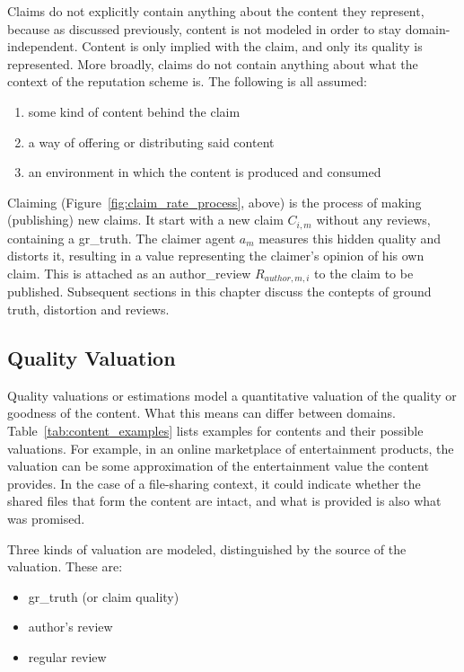 \documentclass[%
    ]{\PathToTumTemplate/thesis/tum_thesis}
\begin{document}
Claims do not explicitly contain anything about the content they represent, because as discussed previously, content is not modeled in order to stay domain-independent.
Content is only implied with the claim, and only its quality is represented.
More broadly, claims do not contain anything about what the context of the reputation scheme is.
The following is all assumed:
\begin{enumerate}
	\item some kind of content behind the claim
	\item a way of offering or distributing said content
	\item an environment in which the content is produced and consumed
\end{enumerate}

Claiming (Figure~\ref{fig:claim_rate_process}, above) is the process of making (publishing) new claims.
It start with a new claim $C_{i,m}$ without any reviews, containing a \gls{gr_truth}.
The claimer agent $a_m$ measures this hidden quality and distorts it, resulting in a value representing the claimer's opinion of his own claim.
This is attached as an \gls{author_review} $R_{author,m,i}$ to the claim to be published.
Subsequent sections in this chapter discuss the contepts of ground truth, distortion and reviews.


\subsection{Quality Valuation}
Quality valuations or estimations model a quantitative valuation of the quality or goodness of the content.
What this means can differ between domains.
Table~\ref{tab:content_examples} lists examples for contents and their possible valuations.
For example, in an online marketplace of entertainment products, the valuation can be some approximation of the entertainment value the content provides.
In the case of a file-sharing context, it could indicate whether the shared files that form the content are intact, and what is provided is also what was promised.

Three kinds of valuation are modeled, distinguished by the source of the valuation. These are:
\begin{itemize}
	\item \gls{gr_truth} (or claim quality)
	\item author's review
	\item regular review
\end{itemize}
\end{document}
